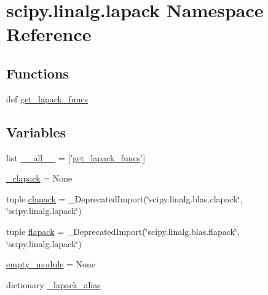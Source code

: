 \hypertarget{namespacescipy_1_1linalg_1_1lapack}{}\section{scipy.\+linalg.\+lapack Namespace Reference}
\label{namespacescipy_1_1linalg_1_1lapack}
\subsection*{Functions}
\begin{DoxyCompactItemize}
\item 
def \hyperlink{namespacescipy_1_1linalg_1_1lapack_af6dcb9ee5594e200b757452cef253cf1}{get\+\_\+lapack\+\_\+funcs}
\end{DoxyCompactItemize}
\subsection*{Variables}
\begin{DoxyCompactItemize}
\item 
list \hyperlink{namespacescipy_1_1linalg_1_1lapack_a12a4b3c5178a989c5ae8795d9289d56f}{\+\_\+\+\_\+all\+\_\+\+\_\+} = \mbox{[}'\hyperlink{namespacescipy_1_1linalg_1_1lapack_af6dcb9ee5594e200b757452cef253cf1}{get\+\_\+lapack\+\_\+funcs}'\mbox{]}
\item 
\hyperlink{namespacescipy_1_1linalg_1_1lapack_a3de85b688648163863b95f0cf3140684}{\+\_\+clapack} = None
\item 
tuple \hyperlink{namespacescipy_1_1linalg_1_1lapack_ab8070c754e34b5dfbe3a165fca04aaa5}{clapack} = \+\_\+\+Deprecated\+Import(\char`\"{}scipy.\+linalg.\+blas.\+clapack\char`\"{}, \char`\"{}scipy.\+linalg.\+lapack\char`\"{})
\item 
tuple \hyperlink{namespacescipy_1_1linalg_1_1lapack_aaf4f8c5ac0a012a57442b865620a4218}{flapack} = \+\_\+\+Deprecated\+Import(\char`\"{}scipy.\+linalg.\+blas.\+flapack\char`\"{}, \char`\"{}scipy.\+linalg.\+lapack\char`\"{})
\item 
\hyperlink{namespacescipy_1_1linalg_1_1lapack_a5b72961ae6843f5436cf4f37948b0ea7}{empty\+\_\+module} = None
\item 
dictionary \hyperlink{namespacescipy_1_1linalg_1_1lapack_abbd091887d94ed9be4fa4cd758a750e7}{\+\_\+lapack\+\_\+alias}
\end{DoxyCompactItemize}


